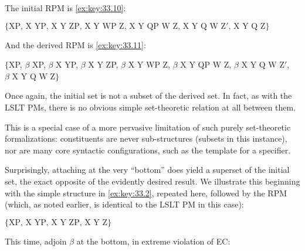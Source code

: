 \documentclass[output=paper]{langsci/langscibook}
\begin{document}
\ea\label{ex:key:33.6}
\z

The initial \gls{RPM} is \eqref{ex:key:33.10}:

\ea\label{ex:key:33.10}$\{\text{XP, X YP, X Y ZP, X Y WP Z, X Y QP W Z, X Y Q W Z$'$, X Y Q Z}\}$
\z

And the derived \gls{RPM} is \eqref{ex:key:33.11}:

\ea\label{ex:key:33.11}$\{$XP, $\beta$ XP, $\beta$ X YP, $\beta$ X Y ZP, $\beta$ X Y WP Z, $\beta$ X Y QP W Z, $\beta$ X Y Q W Z$'$, \\$\beta$ X Y Q W Z$\}$
\z

Once again, the initial set is not a subset of the derived set. In fact, as
with the LSLT\nocite{Chomsky1955} \glspl{PM}, there is no obvious simple
set-theoretic relation at all between them.

This is a special case of a more pervasive limitation of such purely
set-theoretic formalizations: constituents are never sub-structures (subsets in
this instance), nor are many core syntactic configurations, such as the
template for a specifier.

Surprisingly, attaching at the very \enquote{bottom} does yield a superset of the
initial set, the exact opposite of the evidently desired result. We illustrate
this beginning with the simple structure in \eqref{ex:key:33.2}, repeated here, followed by the
\gls{RPM} (which, as noted earlier, is identical to the
LSLT\nocite{Chomsky1955} \gls{PM} in this case):

\ea\label{ex:key:33.12}
\z

\ea\label{ex:key:33.13}$\{\text{XP, X YP, X Y ZP, X Y Z}\}$
\z

This time, adjoin $\beta$ at the bottom, in extreme violation of \gls{EC}:

\ea\label{ex:key:33.14}
\z
\end{document}
